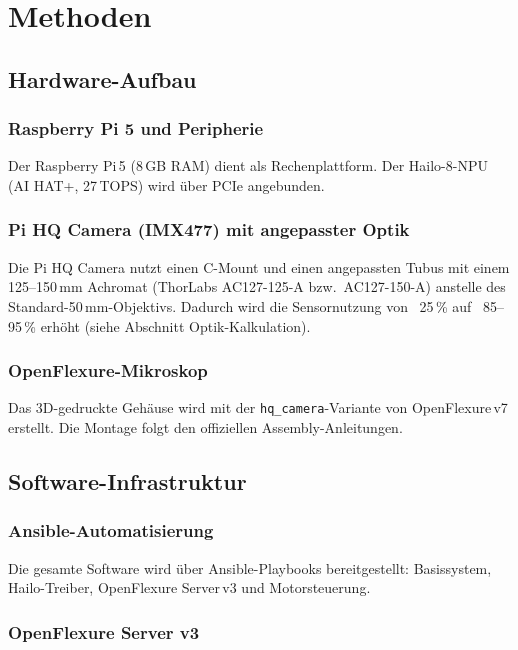 \chapter{Methoden}
\label{chap:methoden}

\section{Hardware-Aufbau}

\subsection{Raspberry Pi 5 und Peripherie}

Der Raspberry Pi\,5 (8\,GB RAM) dient als Rechenplattform. Der Hailo-8-NPU
(AI HAT+, 27\,TOPS) wird über PCIe angebunden.

\subsection{Pi HQ Camera (IMX477) mit angepasster Optik}

Die Pi HQ Camera nutzt einen C-Mount und einen angepassten Tubus mit einem
125--150\,mm Achromat (ThorLabs AC127-125-A bzw.\ AC127-150-A) anstelle des
Standard-50\,mm-Objektivs. Dadurch wird die Sensornutzung von ~25\,\% auf
~85--95\,\% erhöht (siehe Abschnitt Optik-Kalkulation).

\subsection{OpenFlexure-Mikroskop}

Das 3D-gedruckte Gehäuse wird mit der \texttt{hq\_camera}-Variante von
OpenFlexure\,v7 erstellt. Die Montage folgt den offiziellen Assembly-Anleitungen.

\section{Software-Infrastruktur}

\subsection{Ansible-Automatisierung}

Die gesamte Software wird über Ansible-Playbooks bereitgestellt: Basissystem,
Hailo-Treiber, OpenFlexure Server\,v3 und Motorsteuerung.

\subsection{OpenFlexure Server v3}

